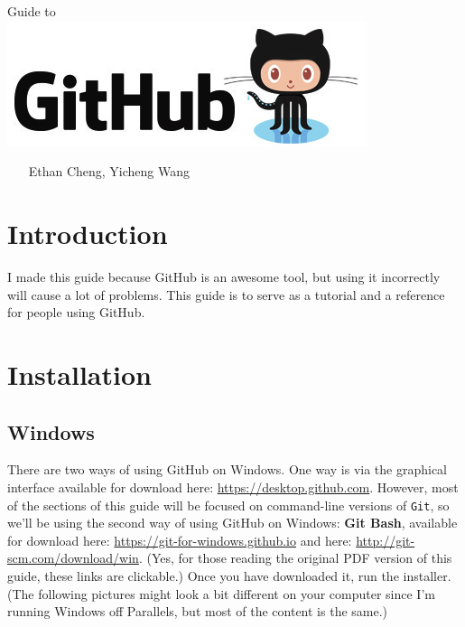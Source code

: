 \documentclass[11pt,fleqn]{article}
\theoremstyle{definition}
\begin{document}
\vspace*{\fill}
\begin{center}
{\Huge
Guide to \hspace{4.4cm} \texttt{ }
}\\
\includegraphics[scale=0.6]{GitHubLogo.jpg}
\end{center}
\begin{center}
\texttt{ } \newline
\texttt{ } \newline
Ethan Cheng, Yicheng Wang
\end{center}
\vspace*{\fill}

\newpage
\tableofcontents

\newpage
\section{Introduction}
I made this guide because GitHub is an awesome tool, but using it incorrectly
will cause a lot of problems. This guide is to serve as a tutorial and a
reference for people using GitHub.
\section{Installation}
\subsection{Windows}
There are two ways of using GitHub on Windows. One way is via the graphical
interface available for download here: \url{https://desktop.github.com}.
However, most of the sections of this guide will be focused on command-line
versions of \texttt{Git}, so we'll be using the second way of using GitHub on
Windows: \textbf{Git Bash}, available for download here:
\url{https://git-for-windows.github.io} and here:
\url{http://git-scm.com/download/win}. (Yes, for those reading the original PDF
version of this guide, these links are clickable.) Once you have downloaded it,
run the installer. (The following pictures might look a bit different on your
computer since I'm running Windows off Parallels, but most of the content is the
same.)
\end{document}
